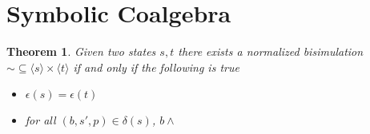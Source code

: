 \documentclass[acmsmall,screen]{acmart}
\newtheorem{theorem}{Theorem}
\newcommand{\At}{\mathbf{At}}
\newcommand{\theoryOf}[1]{\ensuremath{\mathsf{#1}}}
\newcommand{\BExp}{\theoryOf{BExp}}
\DeclareMathOperator{\GS}{\mathrm{GS}}
\begin{document}



 
\section{Symbolic Coalgebra}

\begin{theorem}
    Given two states \(s, t\) there exists a normalized bisimulation \({∼} ⊆ ⟨s⟩ × ⟨t⟩\) if and only if the following is true 
    \begin{itemize}
        \item \(ϵ(s) = ϵ(t)\)
        \item for all \((b, s', p) ∈ δ(s)\), \(b ∧ \)
    \end{itemize}
\end{theorem}
\end{document}
